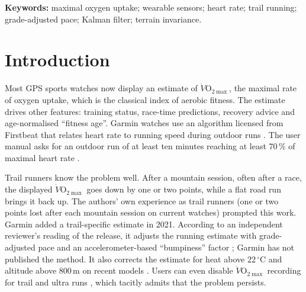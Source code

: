 \documentclass[11pt,a4paper]{article}
\newcommand{\VOmax}{\ensuremath{\dot V\mathrm{O}_{2\max}}}
\begin{document}
\noindent\textbf{Keywords:} maximal oxygen uptake; wearable sensors; heart rate; trail running; grade-adjusted pace; Kalman filter; terrain invariance.


\section{Introduction}

Most GPS sports watches now display an estimate of \VOmax, the maximal rate of oxygen uptake, which is the classical index of aerobic fitness. The estimate drives other features: training status, race-time predictions, recovery advice and age-normalised ``fitness age''. Garmin watches use an algorithm licensed from Firstbeat that relates heart rate to running speed during outdoor runs \citep{firstbeat2014,firstbeatweb}. The user manual asks for an outdoor run of at least ten minutes reaching at least 70\,\% of maximal heart rate \citep{garmin2025}.

Trail runners know the problem well. After a mountain session, often after a race, the displayed \VOmax{} goes down by one or two points, while a flat road run brings it back up. The authors' own experience as trail runners (one or two points lost after each mountain session on current watches) prompted this work. Garmin added a trail-specific estimate in 2021. According to an independent reviewer's reading of the release, it adjusts the running estimate with grade-adjusted pace and an accelerometer-based ``bumpiness'' factor \citep{the5krunner2021}; Garmin has not published the method. It also corrects the estimate for heat above 22\,$^\circ$C and altitude above 800\,m on recent models \citep{garmin2025}. Users can even disable \VOmax{} recording for trail and ultra runs \citep{garmin2025}, which tacitly admits that the problem persists.
\end{document}
